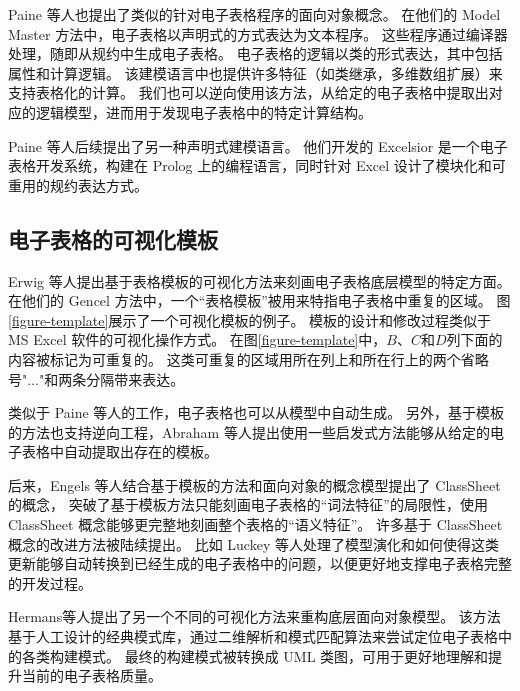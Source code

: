 Paine 等人\cite{ireson1997model,paine2008ensuring}也提出了类似的针对电子表格程序的面向对象概念。
在他们的 Model Master 方法中，电子表格以声明式的方式表达为文本程序。
这些程序通过编译器处理，随即从规约中生成电子表格。
电子表格的逻辑以类的形式表达，其中包括属性和计算逻辑。
该建模语言中也提供许多特征（如类继承，多维数组扩展）来支持表格化的计算。
我们也可以逆向使用该方法，从给定的电子表格中提取出对应的逻辑模型，进而用于发现电子表格中的特定计算结构\cite{paine2008spreadsheet}。

Paine 等人\cite{paine2005bringing,paine2008rapid}后续提出了另一种声明式建模语言。
他们开发的 Excelsior 是一个电子表格开发系统，构建在 Prolog 上的编程语言，同时针对 Excel 设计了模块化和可重用的规约表达方式。


\subsection{电子表格的可视化模板}
Erwig 等人\cite{erwig2004gencel,erwig2005automatic,abraham2005goal}提出基于表格模板的可视化方法来刻画电子表格底层模型的特定方面。
在他们的 Gencel 方法中，一个“表格模板”被用来特指电子表格中重复的区域。
图\ref{figure-template}展示了一个可视化模板的例子。
模板的设计和修改过程类似于 MS Excel 软件的可视化操作方式。
在图\ref{figure-template}中，$B$、$C$和$D$列下面的内容被标记为可重复的。
这类可重复的区域用所在列上和所在行上的两个省略号"..."和两条分隔带来表达。

类似于 Paine 等人的工作，电子表格也可以从模型中自动生成。
另外，基于模板的方法也支持逆向工程，Abraham 等人\cite{abraham2006inferring}提出使用一些启发式方法能够从给定的电子表格中自动提取出存在的模板。

后来，Engels 等人\cite{engels2005classsheets,cunha2010automatically}结合基于模板的方法和面向对象的概念模型提出了 ClassSheet 的概念，
突破了基于模板方法只能刻画电子表格的“词法特征”的局限性，使用 ClassSheet 概念能够更完整地刻画整个表格的“语义特征”。
许多基于 ClassSheet 概念的改进方法被陆续提出\cite{luckey2012systematic,cunha2011type,cunha2011embedding,cunha2012bidirectional}。
比如 Luckey 等人\cite{luckey2012systematic}处理了模型演化和如何使得这类更新能够自动转换到已经生成的电子表格中的问题，以便更好地支撑电子表格完整的开发过程。

Hermans等人\cite{hermans2010automatically}提出了另一个不同的可视化方法来重构底层面向对象模型。
该方法基于人工设计的经典模式库，通过二维解析和模式匹配算法来尝试定位电子表格中的各类构建模式。
最终的构建模式被转换成 UML 类图，可用于更好地理解和提升当前的电子表格质量。

